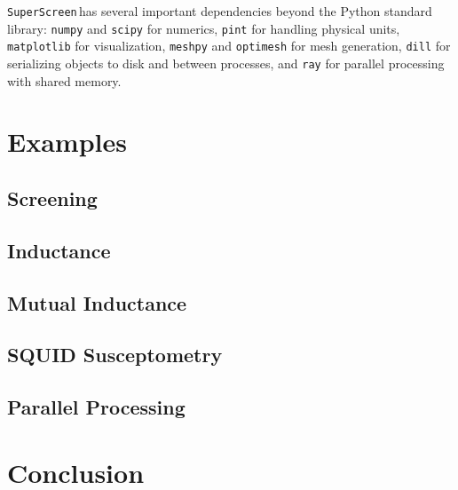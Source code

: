 \documentclass{article}
\newcommand{\SuperScreen}{\texttt{SuperScreen}\,}
\begin{document}
\SuperScreen has several important dependencies beyond the Python standard library: \texttt{numpy} and \texttt{scipy} for numerics, \texttt{pint} for handling physical units, \texttt{matplotlib} for visualization, \texttt{meshpy} and \texttt{optimesh} for mesh generation, \texttt{dill} for serializing objects to disk and between processes, and \texttt{ray} for parallel processing with shared memory.

\section{Examples}
\label{section:examples}

\subsection{Screening}
\label{section:example:screening}

\subsection{Inductance}
\label{section:examples:inductance}

\subsection{Mutual Inductance}
\label{section:examples:mutual-inductance}

\subsection{SQUID Susceptometry}
\label{section:examples:susceptometry}

\subsection{Parallel Processing}
\label{section:examples:parallel}


\section{Conclusion}
\label{section:conlusion}



\end{document}
